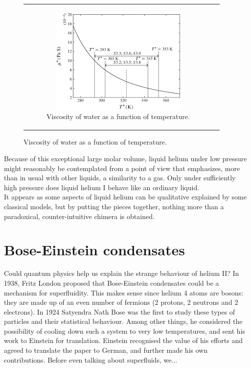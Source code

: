 \documentclass{article}
\begin{document}
\begin{figure}[H]
\begin{tabular}{cc}
\begin{subfigure}{0.5\textwidth}
            \includegraphics[width=\linewidth]{Images/waterVis.png}
            \caption{Viscosity of water as a function of temperature.}
            \label{fig:enter-label}
        \end{subfigure}
   
    \end{tabular}
\end{figure}

Because of this exceptional large molar volume, liquid helium under low pressure might reasonably be contemplated from a point of view that emphasizes, more than in usual with other liquids, a similarity to a gas. Only under sufficiently high pressure does liquid helium I behave like an ordinary liquid.
\\

It appears as some aspects of liquid helium can be qualitative explained by some classical models, but by putting the pieces together, nothing more than a paradoxical, counter-intuitive chimera is obtained. 

\section{Bose-Einstein condensates}

Could quantum physics help us explain the strange behaviour of helium II\@?  In 1938, Fritz London proposed that Bose-Einstein condensates could be a mechanism for superfluidity.  This makes sense since helium 4 atoms are bosons: they are made up of an even number of fermions (2 protons, 2 neutrons and 2 electrons).  In 1924 Satyendra Nath Bose was the first to study these types of particles and their statistical behaviour.  Among other things, he considered the possibility of cooling down such a system to very low temperatures, and sent his work to Einstein for translation.  Einstein recognised the value of his efforts and agreed to translate the paper to German, and further made his own contributions.
Before even talking about superfluids, we...
\end{document}
